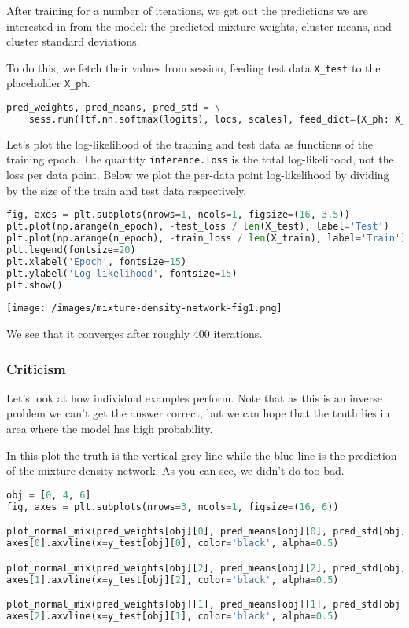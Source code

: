 After training for a number of iterations, we get out the predictions
we are interested in from the model: the predicted mixture weights,
cluster means, and cluster standard deviations.

To do this, we fetch their values from session, feeding test data
\texttt{X_test} to the placeholder \texttt{X_ph}.

\begin{lstlisting}[language=Python]
pred_weights, pred_means, pred_std = \
    sess.run([tf.nn.softmax(logits), locs, scales], feed_dict={X_ph: X_test})
\end{lstlisting}

Let's plot the log-likelihood of the training and test data as
functions of the training epoch. The quantity \texttt{inference.loss}
is the total log-likelihood, not the loss per data point. Below we
plot the per-data point log-likelihood by dividing by the size of the
train and test data respectively.

\begin{lstlisting}[language=Python]
fig, axes = plt.subplots(nrows=1, ncols=1, figsize=(16, 3.5))
plt.plot(np.arange(n_epoch), -test_loss / len(X_test), label='Test')
plt.plot(np.arange(n_epoch), -train_loss / len(X_train), label='Train')
plt.legend(fontsize=20)
plt.xlabel('Epoch', fontsize=15)
plt.ylabel('Log-likelihood', fontsize=15)
plt.show()
\end{lstlisting}

\texttt{[image: /images/mixture-density-network-fig1.png]}

We see that it converges after roughly 400 iterations.

\subsubsection{Criticism}

Let's look at how individual examples perform. Note that as this is an
inverse problem we can't get the answer correct, but we can hope that
the truth lies in area where the model has high probability.

In this plot the truth is the vertical grey line while the blue line
is the prediction of the mixture density network. As you can see, we
didn't do too bad.

\begin{lstlisting}[language=Python]
obj = [0, 4, 6]
fig, axes = plt.subplots(nrows=3, ncols=1, figsize=(16, 6))

plot_normal_mix(pred_weights[obj][0], pred_means[obj][0], pred_std[obj][0], axes[0], comp=False)
axes[0].axvline(x=y_test[obj][0], color='black', alpha=0.5)

plot_normal_mix(pred_weights[obj][2], pred_means[obj][2], pred_std[obj][2], axes[1], comp=False)
axes[1].axvline(x=y_test[obj][2], color='black', alpha=0.5)

plot_normal_mix(pred_weights[obj][1], pred_means[obj][1], pred_std[obj][1], axes[2], comp=False)
axes[2].axvline(x=y_test[obj][1], color='black', alpha=0.5)
\end{lstlisting}

